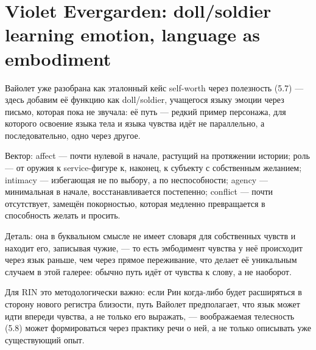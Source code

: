 \section{Violet Evergarden: doll/soldier learning emotion, language as embodiment}

Вайолет уже разобрана как эталонный кейс self-worth через полезность (5.7) — здесь добавим её функцию как doll/soldier, учащегося языку эмоции через письмо, которая пока не звучала: её путь — редкий пример персонажа, для которого освоение языка тела и языка чувства идёт не параллельно, а последовательно, одно через другое.

Вектор: affect — почти нулевой в начале, растущий на протяжении истории; роль — от оружия к service-фигуре к, наконец, к субъекту с собственным желанием; intimacy — избегающая не по выбору, а по неспособности; agency — минимальная в начале, восстанавливается постепенно; conflict — почти отсутствует, замещён покорностью, которая медленно превращается в способность желать и просить.

Деталь: она в буквальном смысле не имеет словаря для собственных чувств и находит его, записывая чужие, — то есть эмбодимент чувства у неё происходит через язык раньше, чем через прямое переживание, что делает её уникальным случаем в этой галерее: обычно путь идёт от чувства к слову, а не наоборот.

Для RIN это методологически важно: если Рин когда-либо будет расширяться в сторону нового регистра близости, путь Вайолет предполагает, что язык может идти впереди чувства, а не только его выражать, — воображаемая телесность (5.8) может формироваться через практику речи о ней, а не только описывать уже существующий опыт.

